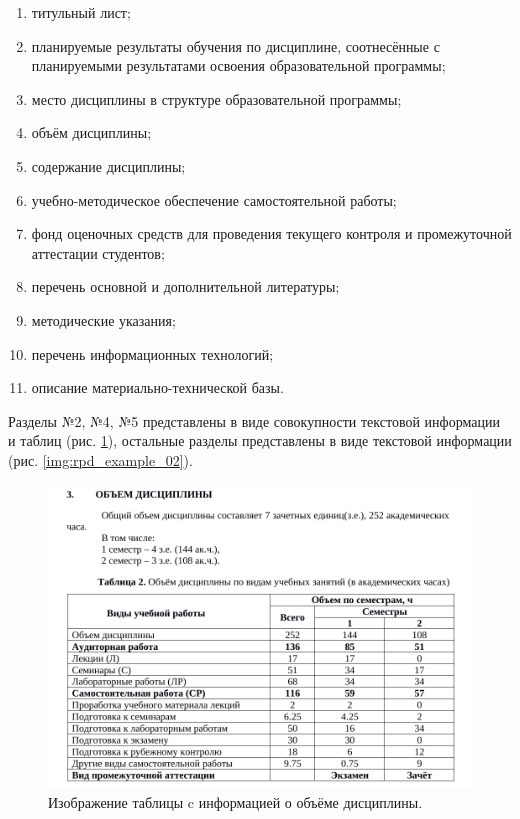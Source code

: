 \begin{enumerate}
	\item титульный лист;
	\item планируемые результаты обучения по дисциплине, соотнесённые с планируемыми результатами освоения образовательной программы;
	\item место дисциплины в структуре образовательной программы;
	\item объём дисциплины;
	\item содержание дисциплины;
	\item учебно-методическое обеспечение самостоятельной работы;
	\item фонд оценочных средств для проведения текущего контроля и промежуточной аттестации студентов;
	\item перечень основной и дополнительной литературы;
	\item методические указания;
	\item перечень информационных технологий;
	\item описание материально-технической базы.
\end{enumerate}

Разделы №2, №4, №5 представлены в виде совокупности текстовой информации и таблиц (рис. \ref{img:rpd_example_01}), остальные разделы представлены в виде текстовой информации (рис. \ref{img:rpd_example_02}).
\clearpage

\begin{figure}[h!]
	\begin{center}
		\includegraphics[scale=0.48]{inc/img/rpd_example_02.png}
	\end{center}
	\captionsetup{justification=centering}
	\caption{Изображение таблицы c информацией о объёме дисциплины.}
	\label{img:rpd_example_01}
\end{figure}

